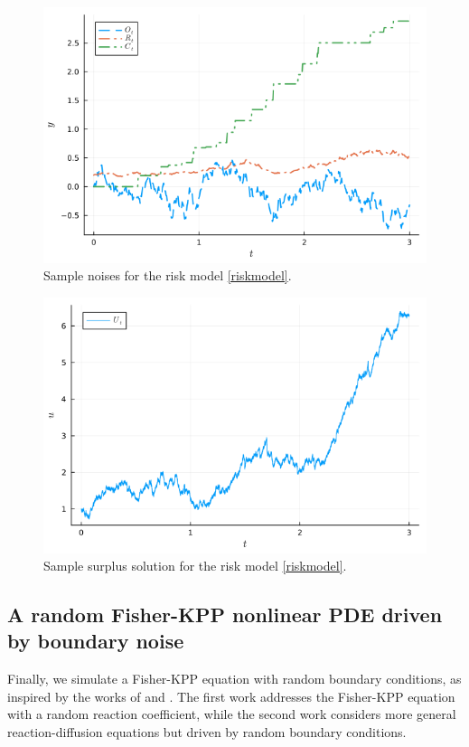 \documentclass[reqno,12pt]{amsart}
\theoremstyle{plain} %
\theoremstyle{definition} %
\begin{document}
\begin{figure}[htb]
    \includegraphics[scale=0.6]{img/riskmodel_noises.png}
    \caption{Sample noises for the risk model \eqref{riskmodel}.}
    \label{figriskmodelnoise}
\end{figure}

\begin{figure}[htb]
    \includegraphics[scale=0.6]{img/riskmodel_surplus.png}
    \caption{Sample surplus solution for the risk model \eqref{riskmodel}.}
    \label{figriskmodelsurplus}
\end{figure}

\subsection{A random Fisher-KPP nonlinear PDE driven by boundary noise}

Finally, we simulate a Fisher-KPP equation with random boundary conditions, as inspired by the works of \cite{SalakoShen2020}  and \cite{FreidlinWentzell1992}. The first work addresses the Fisher-KPP equation with a random reaction coefficient, while the second work considers more general reaction-diffusion equations but driven by random boundary conditions.
\end{document}
